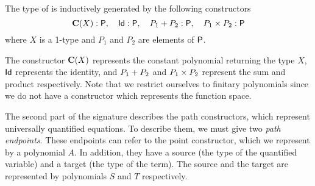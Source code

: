 \begin{definition}
The type of  is inductively generated by the following constructors
\[ 
\operatorname{\mathbf{C}}(X) : \mathsf{P}, \quad \mathsf{Id} : \mathsf{P}, \quad P_1 + P_2 : \mathsf{P}, \quad P_1 \times P_2 : \mathsf{P}
\]
where $X$ is a 1-type and $P_1$ and $P_2$ are elements of $\mathsf{P}$.
\end{definition}

The constructor $\operatorname{\mathbf{C}}(X)$ represents the constant polynomial returning the type $X$, $\mathsf{Id}$ represents the identity,
and $P_1 + P_2$ and $P_1 \times P_2$ represent the sum and product respectively.
Note that we restrict ourselves to finitary polynomials since we do not have a constructor which represents the function space.

The second part of the signature describes the path constructors, which represent universally quantified equations.
To describe them, we must give two \emph{path endpoints}.
These endpoints can refer to the point constructor, which we represent by a polynomial $A$.
In addition, they have a source (the type of the quantified variable) and a target (the type of the term).
The source and the target are represented by polynomials $S$ and $T$ respectively.

